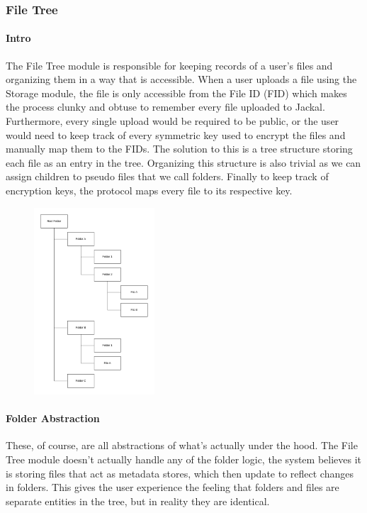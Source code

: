 \documentclass[a4paper]{article}
\begin{document}
\newpage
\subsubsection{File Tree}
\paragraph{Intro}
The File Tree module is responsible for keeping records of a user's files and organizing them in a way that is accessible. When a user uploads a file using the Storage module, the file is only accessible from the File ID (FID) which makes the process clunky and obtuse to remember every file uploaded to Jackal. Furthermore, every single upload would be required to be public, or the user would need to keep track of every symmetric key used to encrypt the files and manually map them to the FIDs. The solution to this is a tree structure storing each file as an entry in the tree. Organizing this structure is also trivial as we can assign children to pseudo files that we call folders. Finally to keep track of encryption keys, the protocol maps every file to its respective key.

\begin{figure}[!htbp]
\centering
\includegraphics[width=0.4\textwidth]{assets/filetree1.png}
\end{figure}

\paragraph{Folder Abstraction}
These, of course, are all abstractions of what's actually under the hood. The File Tree module doesn't actually handle any of the folder logic, the system believes it is storing files that act as metadata stores, which then update to reflect changes in folders. This gives the user experience the feeling that folders and files are separate entities in the tree, but in reality they are identical.
\end{document}
